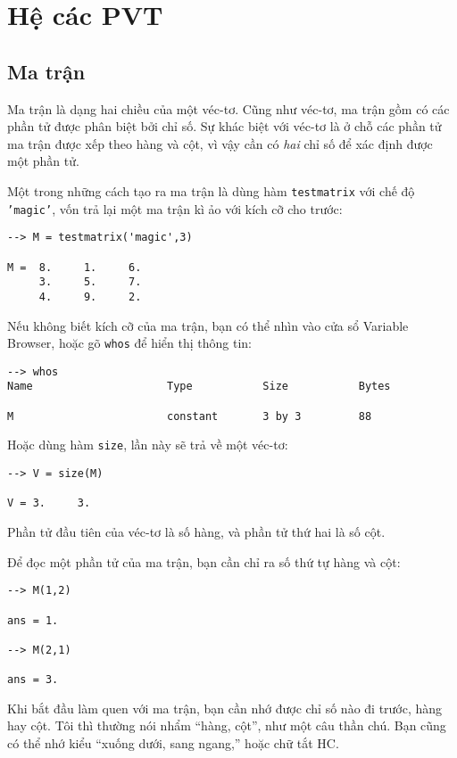 \documentclass[12pt]{book}
\begin{document}
\chapter{Hệ các PVT}

\section{Ma trận}

Ma trận là dạng hai chiều của một véc-tơ. Cũng như véc-tơ, ma trận
gồm có các phần tử được phân biệt bởi chỉ số. Sự khác biệt với
véc-tơ là ở chỗ các phần tử ma trận được xếp theo hàng và cột, 
vì vậy cần có {\em hai} chỉ số để xác định được một phần tử.

Một trong những cách tạo ra ma trận là dùng hàm {\tt testmatrix} 
với chế độ \texttt{'magic'}, vốn trả lại một ma trận kì ảo với kích cỡ cho trước:

\begin{verbatim}
--> M = testmatrix('magic',3)

M =  8.     1.     6.
     3.     5.     7.
     4.     9.     2.
\end{verbatim}
%
Nếu không biết kích cỡ của ma trận, bạn có thể nhìn vào cửa sổ
Variable Browser, hoặc gõ {\tt whos} để hiển thị thông tin:

\begin{verbatim}
--> whos
Name                     Type           Size           Bytes        
 
M                        constant       3 by 3         88           
\end{verbatim}
%
Hoặc dùng hàm {\tt size}, lần này sẽ trả về một véc-tơ:

\begin{verbatim}
--> V = size(M)

V = 3.     3.
\end{verbatim}
%
Phần tử đầu tiên của véc-tơ là số hàng, và phần tử thứ hai là số cột.

Để đọc một phần tử của ma trận, bạn cần chỉ ra số thứ tự hàng và cột:

\begin{verbatim}
--> M(1,2)

ans = 1.

--> M(2,1)

ans = 3.
\end{verbatim}
%
Khi bắt đầu làm quen với ma trận, bạn cần nhớ được chỉ số nào
đi trước, hàng hay cột. Tôi thì thường nói nhẩm ``hàng, cột'',
như một câu thần chú. Bạn cũng có thể nhớ kiểu 
``xuống dưới, sang ngang,'' hoặc chữ tắt HC.
\end{document}
